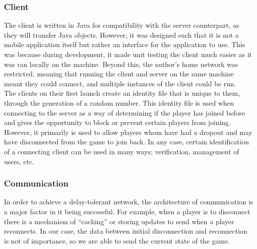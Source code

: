 \documentclass[11pt]{article}
\begin{document}
\newpage
\subsubsection{Client}

The client is written in Java for compatibility with the server counterpart, as they will transfer Java objects. However, it was designed such that it is not a mobile application itself but rather an interface for the application to use. This was because during development, it made unit testing the client much easier as it was ran locally on the machine. Beyond this, the author's home network was restricted, meaning that running the client and server on the same machine meant they could connect, and multiple instances of the client could be run. \\

The clients on their first launch create an identity file that is unique to them, through the generation of a random number. This identity file is used when connecting to the server as a way of determining if the player has joined before and gives the opportunity to block or prevent certain players from joining. However, it primarily is used to allow players whom have had a dropout and may have disconnected from the game to join back. In any case, certain identification of a connecting client can be used in many ways; verification, management of users, etc. 

\subsubsection{Communication} %

In order to achieve a delay-tolerant network, the architecture of communication is a major factor in it being successful. For example, when a player is to disconnect there is a mechanism of “caching” or storing updates to send when a player reconnects. In our case, the data between initial disconnection and reconnection is not of importance, so we are able to send the current state of the game. \\
\end{document}
